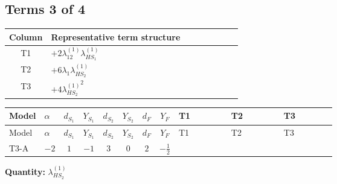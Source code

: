 \documentclass[8pt]{article}
\begin{document}
\begin{landscape}
\subsection*{Terms 3 of 4}
\begin{center}
\begin{tabular}{@{}c >{\raggedright\arraybackslash}p{0.82\linewidth}@{}}
\toprule
Column & Representative term structure \\
\midrule
T1 & \(\displaystyle +2 {\lambda_{12}^{(1)}} {\lambda_{HS_1}^{(1)}}\) \\
\midrule
T2 & \(\displaystyle +6 {\lambda_1} {\lambda_{HS_2}^{(1)}}\) \\
\midrule
T3 & \(\displaystyle +4 {\lambda_{HS_2}^{(1)}}^2\) \\
\midrule
\bottomrule
\end{tabular}
\end{center}
\smallskip
\tiny
\begin{longtable}{@{}llcccccc >{\raggedright\arraybackslash}p{0.21\linewidth} >{\raggedright\arraybackslash}p{0.21\linewidth} >{\raggedright\arraybackslash}p{0.21\linewidth}@{}}
\toprule
Model & $\alpha$ & $d_{S_1}$ & $Y_{S_1}$ & $d_{S_2}$ & $Y_{S_2}$ & $d_F$ & $Y_F$ & T1 & T2 & T3 \\
\midrule
\endfirsthead
\toprule
Model & $\alpha$ & $d_{S_1}$ & $Y_{S_1}$ & $d_{S_2}$ & $Y_{S_2}$ & $d_F$ & $Y_F$ & T1 & T2 & T3 \\
\midrule
\endhead
T3-A & $-2$ & $1$ & $-1$ & $3$ & $0$ & $2$ & $-\frac{1}{2}$ & \scriptsize\adjustbox{max width=\linewidth}{$\begin{gathered} +2 {\lambda_{12}^{(1)}} {\lambda_{HS_1}^{(1)}}\end{gathered}$} & \scriptsize\adjustbox{max width=\linewidth}{$\begin{gathered} +6 {\lambda_1} {\lambda_{HS_2}^{(1)}}\end{gathered}$} & \scriptsize\adjustbox{max width=\linewidth}{$\begin{gathered} +4 {\lambda_{HS_2}^{(1)}}^2\end{gathered}$} \\
\midrule
\bottomrule
\end{longtable}
\clearpage
\noindent\textbf{Quantity: }$\lambda_{HS_2}^{(1)}$\par\smallskip

\end{landscape}
\end{document}
